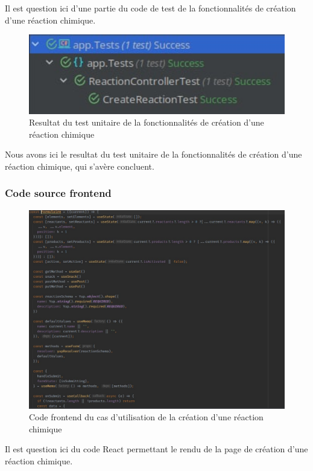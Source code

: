 Il est question ici d'une partie du code de test de la fonctionnalités de création d'une réaction chimique.

\begin{figure}[H]
	\centering
	\includegraphics[width=1\textwidth]{img/utcre}
	\caption{Resultat du test unitaire de la fonctionnalités de création d'une réaction chimique}
\end{figure}

Nous avons ici le resultat du test unitaire de la fonctionnalités de création d'une réaction chimique, qui s'avère concluent.

\subsubsection{Code source frontend}

\begin{figure}[H]
	\centering
	\includegraphics[width=1\textwidth]{img/frec}
	\caption{Code frontend du cas d'utilisation de la création d'une réaction chimique}
\end{figure}

Il est question ici du code React permettant le rendu de la page de création d'une réaction chimique.

